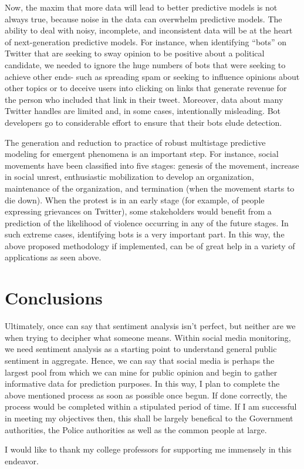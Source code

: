 \documentclass[aps,floatfix,prd,showpacs]{revtex4}
\begin{document}
Now, the maxim that more data will lead to better predictive models is not always true, because noise in the data can overwhelm predictive models. The ability to deal with noisy, incomplete, and inconsistent data will be at the heart of next-generation predictive models. For instance, when identifying “bots” on Twitter that are seeking to sway opinion to be positive about a political candidate, we needed to ignore the huge numbers of bots that were seeking to achieve other ends- such as spreading spam or seeking to influence opinions about other topics or to deceive users into clicking on links that generate revenue for the person who included that link in their tweet. Moreover, data about many Twitter handles are limited and, in some cases, intentionally misleading. Bot developers go to considerable effort to ensure that their bots elude detection.

The generation and reduction to practice of robust multistage predictive modeling for emergent phenomena is an important step. For instance, social movements have been classified into five stages: genesis of the movement, increase in social unrest, enthusiastic mobilization to develop an organization, maintenance of the organization, and termination (when the movement starts to die down). When the protest is in an early stage (for example, of people expressing grievances on Twitter), some stakeholders would benefit from a prediction of the likelihood of violence occurring in any of the future stages. In such extreme cases, identifying bots is a very important part.
In this way, the above proposed methodology if implemented, can be of great help in a variety of applications as seen above.


\section{Conclusions}

Ultimately, once can say that sentiment analysis isn’t perfect, but neither are we when trying to decipher what someone means. Within social media monitoring, we need sentiment analysis as a starting point to understand general public sentiment in aggregate. 
Hence, we can say that social media is perhaps the largest pool from which we can mine for public opinion and begin to gather informative data for prediction purposes. 
In this way, I plan to complete the above mentioned process as soon as possible once begun. If done correctly, the process would be completed within a stipulated period of time. If I am successful in meeting my objectives then, this shall be largely benefical to the Government authorities, the Police authorities as well as the common people at large. 

\acknowledgments
I would like to thank my college professors for supporting me immensely in this endeavor.
\end{document}

